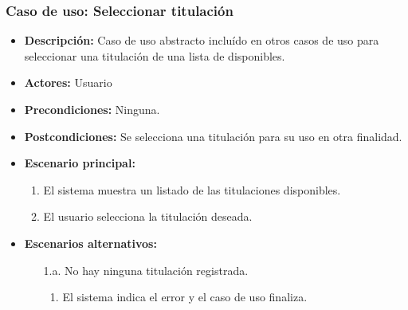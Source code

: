 \subsubsection*{Caso de uso: Seleccionar titulación}
\label{select_titulacion}
\begin{itemize}
\item{\bf Descripción:} Caso de uso abstracto incluído en otros casos de uso para seleccionar una titulación de una lista de disponibles.
\item{\bf Actores:} Usuario
\item{\bf Precondiciones:} Ninguna.
\item{\bf Postcondiciones:} Se selecciona una titulación para su uso en otra finalidad.
\item{\bf Escenario principal:}
\begin{enumerate}
\item El sistema muestra un listado de las titulaciones disponibles.
\item El usuario selecciona la titulación deseada.
\end{enumerate}
\item{\bf Escenarios alternativos:}
\begin{itemize}
\item[1.a.] No hay ninguna titulación registrada.
\begin{enumerate}
\item El sistema indica el error y el caso de uso finaliza.
\end{enumerate}
\end{itemize}
\end{itemize}



